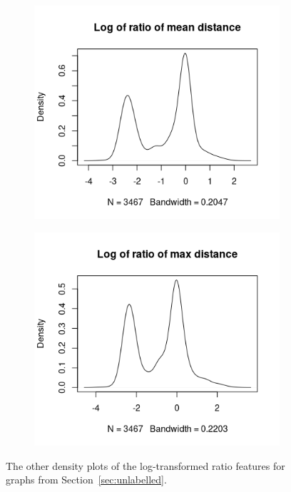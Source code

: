 \documentclass{l4proj}
\theoremstyle{definition}
\theoremstyle{remark}
\begin{document}
\begin{appendices}
\begin{figure}
    \begin{subfigure}[t]{0.49\textwidth}
      \centering
      \includegraphics[width=\textwidth]{images/sip_ratio_meandist.png}
    \end{subfigure}
    \begin{subfigure}[t]{0.49\textwidth}
      \centering
      \includegraphics[width=\textwidth]{images/sip_ratio_maxdist.png}
    \end{subfigure}
    \caption{The other density plots of the log-transformed ratio features for
      graphs from Section~\ref{sec:unlabelled}.}
    \label{fig:sip_ratio}
  \end{figure}

\end{appendices}



\end{document}

